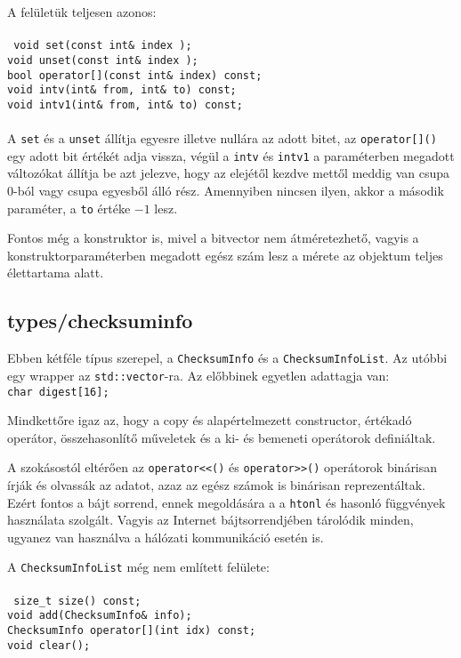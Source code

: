 \documentclass[fleqn,10pt,a4paper,titlepage]{article}
\begin{document}
  A felületük teljesen azonos:\\\\
  \texttt{
    void set(const int\& index );\\
    void unset(const int\& index );\\
    bool operator[](const int\& index) const;\\
    void intv(int\& from, int\&  to) const;\\
    void intv1(int\& from, int\&  to) const;\\\\
  }
  A \texttt{set} és a \texttt{unset} állítja egyesre illetve nullára az adott bitet, az \texttt{operator[]()} egy adott
  bit értékét adja vissza, végül a \texttt{intv} és \texttt{intv1} a paraméterben megadott változókat állítja be
  azt jelezve, hogy az elejétől kezdve mettől meddig van csupa $0$-ból vagy csupa egyesből álló rész. Amennyiben nincsen
  ilyen, akkor a második paraméter, a \texttt{to} értéke $-1$ lesz.

  Fontos még a konstruktor is, mivel a bitvector nem átméretezhető, vagyis a konstruktorparaméterben megadott egész szám
  lesz a mérete az objektum teljes élettartama alatt.

  \subsection{types/checksuminfo}
  Ebben kétféle típus szerepel, a \texttt{ChecksumInfo} és a \texttt{ChecksumInfoList}. Az utóbbi egy wrapper az
  \texttt{std::vector}-ra. Az előbbinek egyetlen adattagja van:\\
  \texttt{char digest[16];}

  Mindkettőre igaz az, hogy a copy és alapértelmezett constructor, értékadó operátor, összehasonlítő műveletek és a
  ki- és bemeneti operátorok definiáltak.

  A szokásostól eltérően az \texttt{operator\textless\textless()} és \texttt{operator\textgreater\textgreater()}
  operátorok binárisan írják és olvassák az adatot, azaz az egész számok is binárisan reprezentáltak. Ezért fontos a
  bájt sorrend, ennek megoldására a a \texttt{htonl} és hasonló függvények használata szolgált. Vagyis az Internet
  bájtsorrendjében tárolódik minden, ugyanez van használva a hálózati kommunikáció esetén is.

  A \texttt{ChecksumInfoList} még nem említett felülete:\\\\
  \texttt{
    size\_t size() const;\\
    void add(ChecksumInfo\& info);\\
    ChecksumInfo operator[](int idx) const;\\
    void clear();
  }
  
\end{document}
